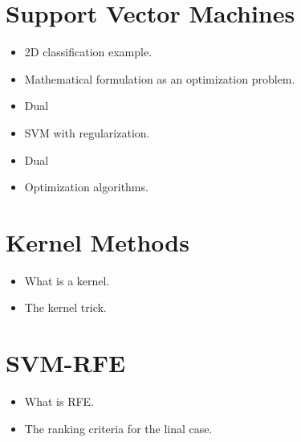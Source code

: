 \section{Support Vector Machines}

\begin{itemize}
    \item 2D classification example.
    \item Mathematical formulation as an optimization problem.
    \item Dual
    \item SVM with regularization.
    \item Dual
    \item Optimization algorithms.
\end{itemize}

\section{Kernel Methods}

\begin{itemize}
    \item What is a kernel.
    \item The kernel trick.
\end{itemize}

\section{SVM-RFE}
\begin{itemize}
    \item What is RFE.
    \item The ranking criteria for the linal case.
\end{itemize}

